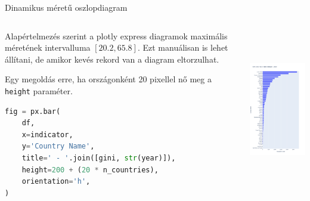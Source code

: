 \documentclass[english, aspectratio=169]{beamer}
\begin{document}
\begin{frame}[fragile]{Dinamikus méretű oszlopdiagram}
	\begin{columns}
		\begin{column}{.5\textwidth}
			Alapértelmezés szerint a plotly express diagramok maximális méretének intervalluma $\left[20.2, 65.8\right]$. Ezt manuálisan is lehet állítani, de amikor kevés rekord van a diagram eltorzulhat.\par\smallskip
			Egy megoldás erre, ha országonként 20 pixellel nő meg a \texttt{height} paraméter.
			\begin{lstlisting}[language=python]
fig = px.bar(
	df,
	x=indicator,
	y='Country Name',
	title=' - '.join([gini, str(year)]),
	height=200 + (20 * n_countries),
	orientation='h',
)
			\end{lstlisting}
		\end{column}
		\begin{column}{.5\textwidth}
			\begin{center}
				\includegraphics[width=7cm, height=7cm, keepaspectratio]{images/plots_16.png}
			\end{center}
		\end{column}
	\end{columns}
\end{frame}
\end{document}
